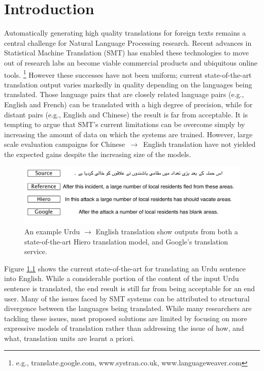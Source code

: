 \chapter{Introduction}

Automatically generating high quality translations for foreign texts remains a central challenge for Natural Language Processing research.
Recent advances in Statistical Machine Translation (SMT) has enabled these technologies to move out of research labs an become viable commercial products and ubiquitous online tools. \footnote{e.g., translate.google.com, www.systran.co.uk, www.languageweaver.com} 
However these successes have not been uniform; 
current state-of-the-art translation output varies markedly in quality depending on the languages being translated. 
Those language pairs that are closely related language pairs (e.g., English and French) can be translated with a high degree of precision, while for distant pairs (e.g., English and Chinese) the result is far from acceptable. 
It is tempting to argue that SMT's current limitations can be overcome simply by increasing the amount of data on which the systems are trained. 
However, large scale evaluation campaigns for Chinese~$\rightarrow$~English translation have not yielded the expected gains despite the increasing size of the models. 

\begin{figure}[t]
  \centering \includegraphics[scale=0.55]{urdu_example_translation.pdf}
\caption{An example Urdu $\rightarrow$ English translation show outputs from both a state-of-the-art Hiero translation model, and Google's translation service.}
\label{fig:intro_urdu_example}
\end{figure}
Figure \ref{fig:intro_urdu_example} shows the current state-of-the-art for translating an Urdu sentence into English.
While a considerable portion of the content of the input Urdu sentence is translated, the end result is still far from being acceptable for an end user. 
Many of the issues faced by SMT systems can be attributed to structural divergence between the languages being translated.
While many researchers are tackling these issues, most proposed solutions are limited by focusing on more expressive models of translation rather than addressing the issue of how, and what, translation units are learnt a priori.


